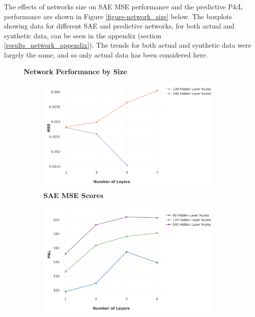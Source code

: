 \documentclass[a4paper,11pt,oneside]{article}
\theoremstyle{plain}
\theoremstyle{definition}
\begin{document}
The effects of networks size on SAE MSE performance and the predictive P\&L performance are shown in Figure \ref{figure-network_size} below. The boxplots showing data for different SAE and predictive networks, for both actual and synthetic data, can be seen in the appendix (section \ref{results_network_appendix}). The trends for both actual and synthetic data were largely the same, and so only actual data has been considered here.

\begin{figure}[H]
	\centering
	\textbf{Network Performance by Size}
	\begin{subfigure}{.5\textwidth}
		\centering 
		\includegraphics[scale=0.25]{images/results/network/actual_mse_lines.png}
		\caption{\textbf{SAE MSE Scores} 
			\newline }
		\label{figure-actual_mse_lines}
	\end{subfigure}%
	\begin{subfigure}{.5\textwidth}
		\centering 
		\includegraphics[scale=0.26]{images/results/network/actual_pl_lines.png}

\end{subfigure}
\end{figure}
\end{document}
